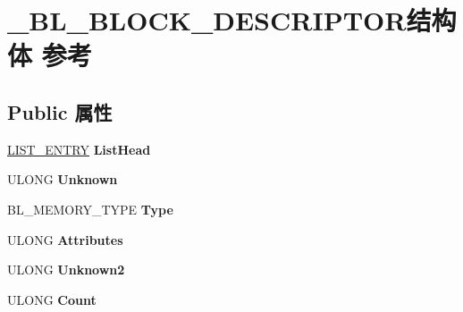 \hypertarget{struct___b_l___b_l_o_c_k___d_e_s_c_r_i_p_t_o_r}{}\section{\+\_\+\+B\+L\+\_\+\+B\+L\+O\+C\+K\+\_\+\+D\+E\+S\+C\+R\+I\+P\+T\+O\+R结构体 参考}
\label{struct___b_l___b_l_o_c_k___d_e_s_c_r_i_p_t_o_r}
\subsection*{Public 属性}
\begin{DoxyCompactItemize}
\item 
\mbox{\label{struct___b_l___b_l_o_c_k___d_e_s_c_r_i_p_t_o_r_a86bf52d912e68177039e03081f00e8e3}} 
\hyperlink{struct___l_i_s_t___e_n_t_r_y}{L\+I\+S\+T\+\_\+\+E\+N\+T\+RY} {\bfseries List\+Head}
\item 
\mbox{\label{struct___b_l___b_l_o_c_k___d_e_s_c_r_i_p_t_o_r_ae07d50f13f8ea52a70714e58b2d251f5}} 
U\+L\+O\+NG {\bfseries Unknown}
\item 
\mbox{\label{struct___b_l___b_l_o_c_k___d_e_s_c_r_i_p_t_o_r_aab36efdce406c573b408cb882497cab3}} 
B\+L\+\_\+\+M\+E\+M\+O\+R\+Y\+\_\+\+T\+Y\+PE {\bfseries Type}
\item 
\mbox{\label{struct___b_l___b_l_o_c_k___d_e_s_c_r_i_p_t_o_r_a6b9188ede62502d52587d661c256e6b1}} 
U\+L\+O\+NG {\bfseries Attributes}
\item 
\mbox{\label{struct___b_l___b_l_o_c_k___d_e_s_c_r_i_p_t_o_r_a08667da89dbf38ff777ee42a32fc42e8}} 
U\+L\+O\+NG {\bfseries Unknown2}
\item 
\mbox{\label{struct___b_l___b_l_o_c_k___d_e_s_c_r_i_p_t_o_r_a0665fbe6d04da3a5959646addb930c5f}} 
U\+L\+O\+NG {\bfseries Count}
\item 
\mbox{\label{struct___b_l___b_l_o_c_k___d_e_s_c_r_i_p_t_o_r_a66c33e9b6f5246d3cbc2bd066e0582f5}} 

\end{DoxyCompactItemize}
